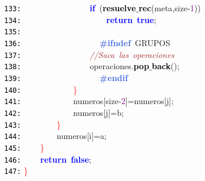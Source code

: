 \documentclass[a4paper,10pt]{scrartcl}
\begin{document}
{   \mbox{}\texttt{\textcolor{Black}{133:}} \ \ \ \ \ \ \ \ \ \ \ \ \ \ \ \ \textbf{\textcolor{Blue}{if}}\ \textcolor{BrickRed}{(}\textbf{\textcolor{Black}{resuelve$\_$rec}}\textcolor{BrickRed}{(}meta\textcolor{BrickRed}{,}size\textcolor{BrickRed}{-}\textcolor{Purple}{1}\textcolor{BrickRed}{))} \\
   \mbox{}\texttt{\textcolor{Black}{134:}} \ \ \ \ \ \ \ \ \ \ \ \ \ \ \ \ \ \ \ \ \textbf{\textcolor{Blue}{return}}\ \textbf{\textcolor{Blue}{true}}\textcolor{BrickRed}{;} \\
   \mbox{}\texttt{\textcolor{Black}{135:}} \ \ \ \ \ \ \ \  \\
   \mbox{}\texttt{\textcolor{Black}{136:}} \textbf{\textcolor{RoyalBlue}{\ \ \ \ \ \ \ \ \ \ \ \ \ \ \ \ \#ifndef}}\ GRUPOS \\
   \mbox{}\texttt{\textcolor{Black}{137:}} \ \ \ \ \ \ \ \ \ \ \ \ \ \ \ \ \textit{\textcolor{Brown}{//Saca\ las\ operaciones}} \\
   \mbox{}\texttt{\textcolor{Black}{138:}} \ \ \ \ \ \ \ \ \ \ \ \ \ \ \ \ operaciones\textcolor{BrickRed}{.}\textbf{\textcolor{Black}{pop$\_$back}}\textcolor{BrickRed}{();} \\
   \mbox{}\texttt{\textcolor{Black}{139:}} \textbf{\textcolor{RoyalBlue}{\ \ \ \ \ \ \ \ \ \ \ \ \ \ \ \ \#endif}} \\
   \mbox{}\texttt{\textcolor{Black}{140:}} \ \ \ \ \ \ \ \ \ \ \ \ \textcolor{Red}{\}} \\
   \mbox{}\texttt{\textcolor{Black}{141:}} \ \ \ \ \ \ \ \ \ \ \ \ numeros\textcolor{BrickRed}{[}size\textcolor{BrickRed}{-}\textcolor{Purple}{2}\textcolor{BrickRed}{]=}numeros\textcolor{BrickRed}{[}j\textcolor{BrickRed}{];} \\
   \mbox{}\texttt{\textcolor{Black}{142:}} \ \ \ \ \ \ \ \ \ \ \ \ numeros\textcolor{BrickRed}{[}j\textcolor{BrickRed}{]=}b\textcolor{BrickRed}{;} \\
   \mbox{}\texttt{\textcolor{Black}{143:}} \ \ \ \ \ \ \ \ \textcolor{Red}{\}} \\
   \mbox{}\texttt{\textcolor{Black}{144:}} \ \ \ \ \ \ \ \ numeros\textcolor{BrickRed}{[}i\textcolor{BrickRed}{]=}a\textcolor{BrickRed}{;} \\
   \mbox{}\texttt{\textcolor{Black}{145:}} \ \ \ \ \textcolor{Red}{\}} \\
   \mbox{}\texttt{\textcolor{Black}{146:}} \ \ \ \ \textbf{\textcolor{Blue}{return}}\ \textbf{\textcolor{Blue}{false}}\textcolor{BrickRed}{;} \\
   \mbox{}\texttt{\textcolor{Black}{147:}} \textcolor{Red}{\}} \\
}
\end{document}
